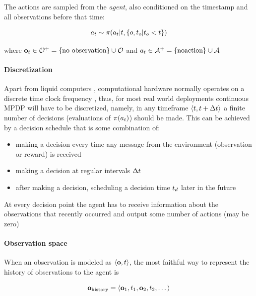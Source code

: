 The actions are sampled from the \emph{agent}, also conditioned on the
timestamp and all observations before that time:

\begin{equation}
a_t \sim \pi(a_t|t, \{ o, t_o | t_o < t \})
\end{equation}

where $\mathbf{o}_t \in \mathcal{O}^{+} = \{\text{no observation} \} \cup \mathcal{O}$ and $a_t \in \mathcal{A}^{+} = \{\text{noaction} \} \cup \mathcal{A}$

\paragraph{Discretization}

Apart from liquid computers \cite{adamatzkyBriefHistoryLiquid2019}, computational hardware normally operates on a discrete time clock frequency \cite{publishingCPU2023}, thus, for most real world deployments continuous MPDP will have to be discretized, namely, in any timeframe $\langle t, t + \Delta t \rangle$ a finite number of decisions (evaluations of $\pi(a_t)$) should be made. This can be achieved by a decision schedule that is some combination of:

\begin{itemize}
\item   making a decision every time any message from the environment   (observation or reward) is received 
\item   making a decision at regular intervals $\Delta t$ 
\item   after making a decision, scheduling a decision time $t_d$ later in the future
\end{itemize}

At every decision point the agent has to receive information about the observations that recently occurred and output some number of actions (may be zero)

\paragraph{Observation space}

When an observation is modeled as $\langle \mathbf{o}, t \rangle$, the most faithful way to represent the history of observations to the agent is

\begin{equation} 
\mathbf{o}_\text{history} = \langle \mathbf{o}_1, t_1, \mathbf{o}_2, t_2, \dots \rangle 
\end{equation}

